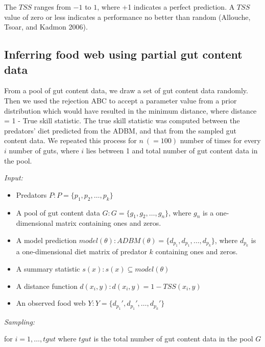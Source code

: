 \documentclass{article}
\begin{document}
The \(TSS\) ranges from \(-1\) to \(1\), where +1 indicates a perfect
prediction. A \(TSS\) value of zero or less indicates a performance no
better than random (Allouche, Tsoar, and Kadmon 2006).

\hypertarget{inferring-food-web-using-partial-gut-content-data}{%
\subsection{Inferring food web using partial gut content
data}\label{inferring-food-web-using-partial-gut-content-data}}

From a pool of gut content data, we draw a set of gut content data
randomly. Then we used the rejection ABC to accept a parameter value
from a prior distribution which would have resulted in the minimum
distance, where distance = 1 - True skill statistic. The true skill
statistic was computed between the predators' diet predicted from the
ADBM, and that from the sampled gut content data. We repeated this
process for \(n~(= 100)\) number of times for every \(i\) number of
guts, where \(i\) lies between 1 and total number of gut content data in
the pool.

\emph{Input:}

\begin{itemize}
\item
  Predators \(P: P = \{p_1, p_2, \dots, p_k \}\)
\item
  A pool of gut content data \(G: G = \{g_1, g_2, \dots, g_n\}\), where
  \(g_{n}\) is a one-dimensional matrix containing ones and zeros.
\item
  A model prediction
  \(model(\theta): ADBM(\theta) = \{d_{p_1}, d_{p_1}, \dots, d_{p_k}\}\),
  where \(d_{p_k}\) is a one-dimensional diet matrix of predator \(k\)
  containing ones and zeros.
\item
  A summary statistic \(s(x): s(x) \subseteq model(\theta)\)
\item
  A distance function \(d(x_i, y) : d(x_i,y) = 1 - TSS(x_i, y)\)
\item
  An observed food web
  \(Y: Y = \{d_{p_1}', d_{p_1}', \dots, d_{p_k}'\}\)
\end{itemize}

\emph{Sampling:}

for \(i = 1, \dots, tgut\) where \(tgut\) is the total number of gut
content data in the pool \(G\)
\end{document}
